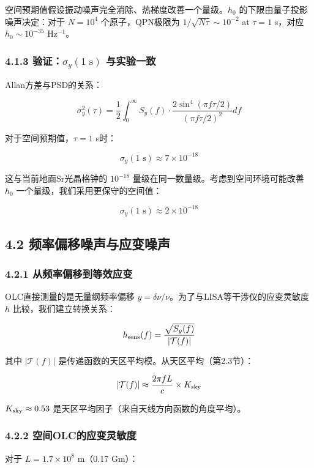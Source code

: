 \documentclass[12pt,a4paper]{article}
\begin{document}
空间预期值假设振动噪声完全消除、热梯度改善一个量级。$h_0$ 的下限由量子投影噪声决定：对于 $N = 10^4$ 个原子，QPN极限为 $1/\sqrt{N\tau} \sim 10^{-2}$ at $\tau = 1$ s，对应 $h_0 \sim 10^{-35}$ Hz$^{-1}$。

\subsubsection{4.1.3 验证：$\sigma_y(1\text{ s})$ 与实验一致}


Allan方差与PSD的关系：

$$\sigma_y^2(\tau) = \frac{1}{2} \int_0^\infty S_y(f) \cdot \frac{2\sin^4(\pi f \tau/2)}{(\pi f \tau/2)^2} df$$

对于空间预期值，$\tau = 1$ s时：

$$\sigma_y(1\text{ s}) \approx 7 \times 10^{-18}$$

这与当前地面Sr光晶格钟的 $10^{-18}$ 量级在同一数量级。考虑到空间环境可能改善 $h_0$ 一个量级，我们采用更保守的空间值：

$$\sigma_y(1\text{ s}) \approx 2 \times 10^{-18}$$

\subsection{4.2 频率偏移噪声与应变噪声}


\subsubsection{4.2.1 从频率偏移到等效应变}


OLC直接测量的是无量纲频率偏移 $y = \delta\nu/\nu$。为了与LISA等干涉仪的应变灵敏度 $h$ 比较，我们建立转换关系：

$$h_{\rm sens}(f) = \frac{\sqrt{S_y(f)}}{|\mathcal{T}(f)|}$$

其中 $|\mathcal{T}(f)|$ 是传递函数的天区平均模。从天区平均（第2.3节）：

$$|\mathcal{T}(f)| \approx \frac{2\pi f L}{c} \times K_{\rm sky}$$

$K_{\rm sky} \approx 0.53$ 是天区平均因子（来自天线方向函数的角度平均）。

\subsubsection{4.2.2 空间OLC的应变灵敏度}


对于 $L = 1.7 \times 10^8$ m（0.17 Gm）：
\end{document}
